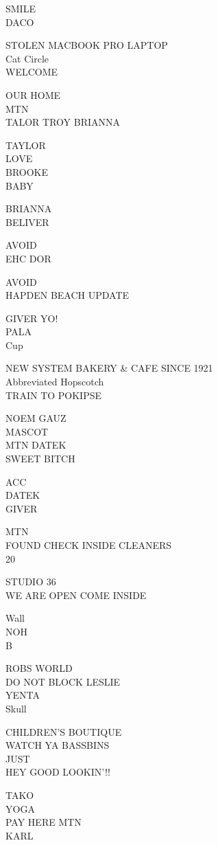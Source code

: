 \documentclass[10pt,letterpaper]{article}
\begin{document}
SMILE\\
DACO

STOLEN MACBOOK PRO LAPTOP\\
Cat Circle\\
WELCOME

OUR HOME\\
MTN\\
TALOR TROY BRIANNA

TAYLOR\\
LOVE\\
BROOKE\\
BABY

BRIANNA\\
BELIVER

AVOID\\
EHC DOR

AVOID\\
HAPDEN BEACH UPDATE

GIVER YO!\\
PALA\\
Cup

NEW SYSTEM BAKERY \& CAFE SINCE 1921\\
Abbreviated Hopscotch\\
TRAIN TO POKIPSE

NOEM GAUZ\\
MASCOT\\
MTN DATEK\\
SWEET BITCH

ACC\\
DATEK\\
GIVER

MTN\\
FOUND CHECK INSIDE CLEANERS\\
20

STUDIO 36\\
WE ARE OPEN COME INSIDE

Wall\\
NOH\\
B

ROBS WORLD\\
DO NOT BLOCK LESLIE\\
YENTA\\
Skull

CHILDREN'S BOUTIQUE\\
WATCH YA BASSBINS\\
JUST\\
HEY GOOD LOOKIN'!!

TAKO\\
YOGA\\
PAY HERE MTN\\
KARL
\end{document}
